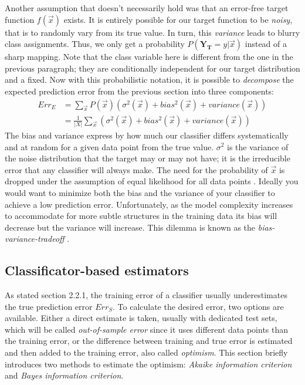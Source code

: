 Another assumption that doesn't necessarily hold was that an error-free target function $f(\vec{x})$ exists. It is entirely possible for our target function to be \textit{noisy}, that is to randomly vary from its true value. In turn, this \textit{variance} leads to blurry class assignments. Thus, we only get a probability $P(\mathbf{Y_T} = y | \vec{x})$ instead of a sharp mapping. Note that the class variable here is different from the one in the previous paragraph; they are conditionally independent for our target distribution and a fixed. Now with this probabilistic notation, it is possible to \textit{decompose} the expected prediction error from the previous section into three components:
\begin{equation}
\begin{split}
Err_{E} &= \sum_{\vec{x}}^{}P(\vec{x})\left(\sigma^2(\vec{x}) + bias^2(\vec{x}) + variance(\vec{x})\right) \\
&= \frac{1}{|X|}\sum_{\vec{x}}^{}\left(\sigma^2(\vec{x}) + bias^2(\vec{x}) + variance(\vec{x})\right)
\end{split}
\end{equation}
The bias and variance express by how much our classifier differs systematically and at random for a given data point from the true value. $\sigma^2$ is the variance of the noise distribution that the target may or may not have; it is the irreducible error that any classifier will always make. The need for the probability of $\vec{x}$ is dropped under the assumption of equal likelihood for all data points \cite{KohaviEtAl1996}. Ideally you would want to minimize both the bias and the variance of your classifier to achieve a low prediction error. Unfortunately, as the model complexity increases to accommodate for more subtle structures in the training data its bias will decrease but the variance will increase. This dilemma is known as the \textit{bias-variance-tradeoff} \cite{KroghVedelsby1995}.

\subsection{Classificator-based estimators}
As stated section 2.2.1, the training error of a classifier usually underestimates the true prediction error $Err_S$. To calculate the desired error, two options are available. Either a direct estimate is taken, usually with dedicated test sets, which will be called \textit{out-of-sample error} since it uses different data points than the training error, or the difference between training and true error is estimated and then added to the training error, also called \textit{optimism}. This section briefly introduces two methods to estimate the optimism: \textit{Akaike information criterion} and \textit{Bayes information criterion}.

